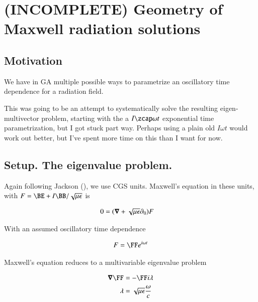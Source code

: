 %

\chapter{(INCOMPLETE) Geometry of Maxwell radiation solutions}
\label{chap:radiationGeometry}
{}
\date{Aug 14, 2009}

\beginArtWithToc

\section{Motivation}

We have in GA multiple possible ways to parametrize an oscillatory time dependence for a radiation field.  

This was going to be an attempt to systematically solve the resulting eigen-multivector problem, starting with the a $I\zcap \omega t$ exponential time parametrization, but I got stuck part way.  Perhaps using a plain old $I \omega t$ would work out better, but I've spent more time on this than I want for now.

\section{Setup.  The eigenvalue problem.}

Again following Jackson (\cite{jackson1975cew}), we use CGS units.  Maxwell's equation in these units, with $F = \BE + I\BB/\sqrt{\mu\epsilon}$ is

\begin{align}\label{eqn:radiationGeometry:foo1}
0 &= (\boldsymbol{\nabla} + \sqrt{\mu\epsilon} \partial_0) F 
\end{align}

With an assumed oscillatory time dependence 

\begin{align}\label{eqn:radiationGeometry:foo2}
F = 
\FF 
e^{i\omega t}
\end{align}

Maxwell's equation reduces to a multivariable eigenvalue problem

\begin{align}\label{eqn:radiationGeometry:foo3}
\spacegrad \FF &= - \FF i \lambda \\
\lambda &= \sqrt{\mu\epsilon} \frac{\omega}{c} 
\end{align}

